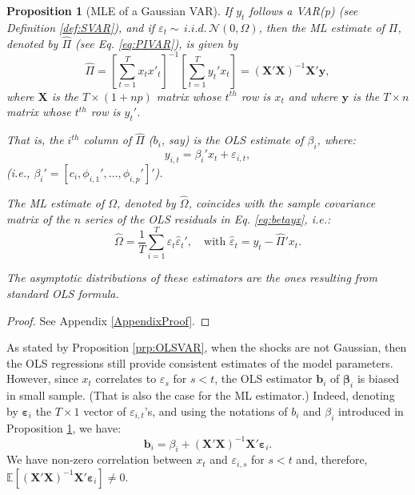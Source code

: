 \documentclass[
  12pt,
]{book}
\newtheorem{proposition}{Proposition}[chapter]
\theoremstyle{definition}
\theoremstyle{definition}
\theoremstyle{definition}
\theoremstyle{definition}
\theoremstyle{remark}
\begin{document}
\begin{proposition}[MLE of a Gaussian VAR]
\protect\hypertarget{prp:estimVARGaussian}{}\label{prp:estimVARGaussian}If \(y_t\) follows a VAR(p) (see Definition \ref{def:SVAR}), and if \(\varepsilon_t \sim \,i.i.d.\,\mathcal{N}(0,\Omega)\), then the ML estimate of \(\Pi\), denoted by \(\hat{\Pi}\) (see Eq. \eqref{eq:PIVAR}), is given by
\begin{equation}
\hat{\Pi}=\left[\sum_{t=1}^{T}x_{t}x'_{t}\right]^{-1}\left[\sum_{t=1}^{T}y_{t}'x_{t}\right]= (\mathbf{X}'\mathbf{X})^{-1}\mathbf{X}'\mathbf{y},\label{eq:Pi}
\end{equation}
where \(\mathbf{X}\) is the \(T \times (1+np)\) matrix whose \(t^{th}\) row is \(x_t\) and where \(\mathbf{y}\) is the \(T \times n\) matrix whose \(t^{th}\) row is \(y_{t}'\).

That is, the \(i^{th}\) column of \(\hat{\Pi}\) (\(b_i\), say) is the OLS estimate of \(\beta_i\), where:
\begin{equation}
y_{i,t} = \beta_i'x_t + \varepsilon_{i,t},\label{eq:betayx}
\end{equation}
(i.e., \(\beta_i' = [c_i,\phi_{i,1}',\dots,\phi_{i,p}']'\)).

The ML estimate of \(\Omega\), denoted by \(\hat{\Omega}\), coincides with the sample covariance matrix of the \(n\) series of the OLS residuals in Eq. \eqref{eq:betayx}, i.e.:
\begin{equation}
\hat{\Omega} = \frac{1}{T} \sum_{i=1}^T \hat{\varepsilon}_t\hat{\varepsilon}_t',\quad\mbox{with } \hat{\varepsilon}_t= y_t - \hat{\Pi}'x_t.
\end{equation}

The asymptotic distributions of these estimators are the ones resulting from standard OLS formula.
\end{proposition}

\begin{proof}
See Appendix \ref{AppendixProof}.
\end{proof}

As stated by Proposition \ref{prp:OLSVAR}, when the shocks are not Gaussian, then the OLS regressions still provide consistent estimates of the model parameters. However, since \(x_t\) correlates to \(\varepsilon_s\) for \(s<t\), the OLS estimator \(\mathbf{b}_i\) of \(\boldsymbol\beta_i\) is biased in small sample. (That is also the case for the ML estimator.) Indeed, denoting by \(\boldsymbol\varepsilon_i\) the \(T \times 1\) vector of \(\varepsilon_{i,t}\)'s, and using the notations of \(b_i\) and \(\beta_i\) introduced in Proposition \ref{prp:estimVARGaussian}, we have:
\begin{equation}
\mathbf{b}_i = \beta_i + (\mathbf{X}'\mathbf{X})^{-1}\mathbf{X}'\boldsymbol\varepsilon_i.\label{eq:olsar1}
\end{equation}
We have non-zero correlation between \(x_t\) and \(\varepsilon_{i,s}\) for \(s<t\) and, therefore, \(\mathbb{E}[(\mathbf{X}'\mathbf{X})^{-1}\mathbf{X}'\boldsymbol\varepsilon_i] \ne 0\).
\end{document}
